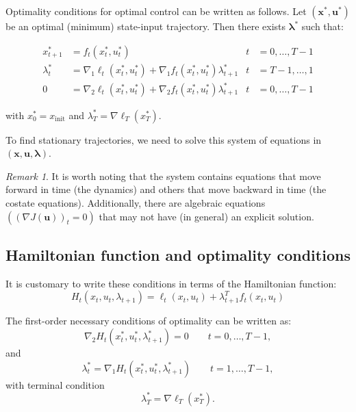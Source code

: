 \documentclass[openany]{book}
\theoremstyle{definition}
\theoremstyle{remark}
\newtheorem*{remark}{Remark}
\begin{document}
Optimality conditions for optimal control can be written as follows. Let $(\mathbf{x}^*, \mathbf{u}^*)$ be an optimal (minimum) state-input trajectory. Then there exists $\boldsymbol{\lambda}^*$ such that:

\begin{align*}
x_{t+1}^* &= f_t(x_t^*, u_t^*) & t &= 0,\ldots,T-1 \\
\lambda_t^* &= \nabla_1\ell_t(x_t^*, u_t^*) + \nabla_1f_t(x_t^*, u_t^*)\lambda_{t+1}^* & t &= T-1,\ldots,1 \\
0 &= \nabla_2\ell_t(x_t^*, u_t^*) + \nabla_2f_t(x_t^*, u_t^*)\lambda_{t+1}^* & t &= 0,\ldots,T-1
\end{align*}

with $x_0^* = x_{\text{init}}$ and $\lambda_T^* = \nabla\ell_T(x_T^*)$.

To find stationary trajectories, we need to solve this system of equations in $(\mathbf{x}, \mathbf{u}, \boldsymbol{\lambda})$.

\begin{remark}
It is worth noting that the system contains equations that move forward in time (the dynamics) and others that move backward in time (the costate equations). Additionally, there are algebraic equations $((\nabla J(\mathbf{u}))_t = 0)$ that may not have (in general) an explicit solution.
\end{remark}



\subsection{Hamiltonian function and optimality conditions}

It is customary to write these conditions in terms of the Hamiltonian function:
\begin{equation}
H_t(x_t, u_t, \lambda_{t+1}) = \ell_t(x_t, u_t) + \lambda_{t+1}^T f_t(x_t, u_t)
\end{equation}

The first-order necessary conditions of optimality can be written as:
\begin{equation}
\nabla_2 H_t(x_t^*, u_t^*, \lambda_{t+1}^*) = 0 \qquad t = 0,\ldots,T-1,
\end{equation}
and
\begin{equation}
\lambda_t^* = \nabla_1 H_t(x_t^*, u_t^*, \lambda_{t+1}^*) \qquad t = 1,\ldots,T-1,
\end{equation}
with terminal condition
\begin{equation}
\lambda_T^* = \nabla\ell_T(x_T^*).
\end{equation}
\end{document}
